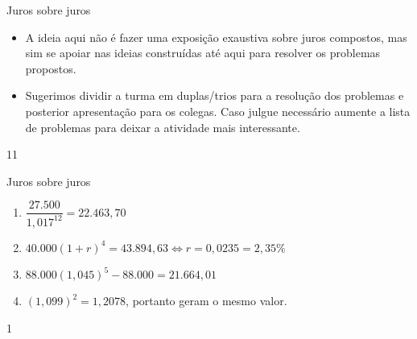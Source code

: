 \begin{sugestions}{Juros sobre juros}
{
\begin{itemize}
\item A ideia aqui não é fazer uma exposição exaustiva sobre juros compostos, mas sim se apoiar nas ideias construídas até aqui para resolver os problemas propostos.

\item  Sugerimos dividir a turma em duplas/trios para a resolução dos problemas e posterior apresentação para os colegas. Caso julgue necessário aumente a lista de problemas para deixar a atividade mais interessante.

\end{itemize}
}{1}{1}
\end{sugestions}
\begin{answer}{Juros sobre juros}
{
\begin{enumerate}

\item{}
$\dfrac{27.500}{1{,}017^{12}}=22.463{,}70$

\item{}
$40.000(1+r)^4=43.894{,}63 \iff r=0,0235=2{,}35\%$

\item
$88.000(1{,}045)^5-88.000=21.664{,}01$

\item
$(1{,}099)^2=1{,}2078$, portanto geram o mesmo valor.

\end{enumerate}
}{1}
\end{answer}

